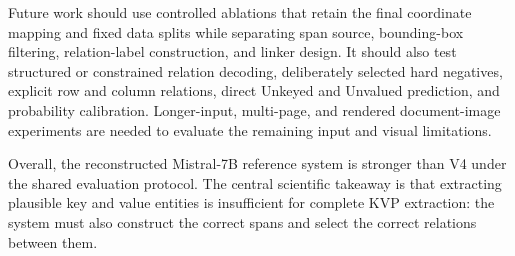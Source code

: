 Future work should use controlled ablations that retain the final coordinate
mapping and fixed data splits while separating span source, bounding-box
filtering, relation-label construction, and linker design. It should also test
structured or constrained relation decoding, deliberately selected hard
negatives, explicit row and column relations, direct Unkeyed and Unvalued
prediction, and probability calibration. Longer-input, multi-page, and rendered
document-image experiments are needed to evaluate the remaining input and
visual limitations.

Overall, the reconstructed Mistral-7B reference system is stronger than V4
under the shared evaluation protocol. The central scientific takeaway is that
extracting plausible key and value entities is insufficient for complete KVP
extraction: the system must also construct the correct spans and select the
correct relations between them.
